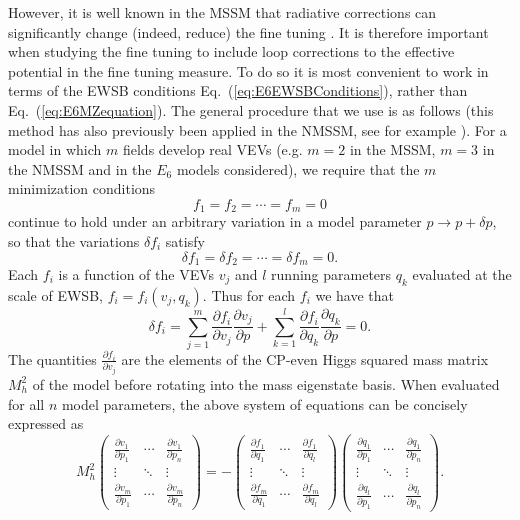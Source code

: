 \documentclass[preprint,amsmath,amssymb,aps,superscriptaddress,prd,
showpacs,floatfix,nofootinbib]{revtex4-1}
\begin{document}
However, it is well known in the MSSM that radiative corrections can
significantly change (indeed, reduce) the fine tuning \cite{Cassel:2010px}.
It is therefore important when studying the fine tuning to include loop
corrections to the effective potential in the fine tuning measure.  To do so
it is most convenient to work in terms of the EWSB conditions
Eq.~(\ref{eq:E6EWSBConditions}), rather than Eq.~(\ref{eq:E6MZequation}).
The general procedure that we use is as follows (this method has also
previously been applied in the NMSSM, see for example
\cite{Ellwanger:2011mu}).  For a model in which $m$ fields develop real
VEVs (e.g. $m=2$ in the MSSM, $m=3$ in the NMSSM and in the $E_6$
models considered), we require that the $m$ minimization conditions
\begin{equation} \label{eq:EWSBconditions}
f_1 = f_2 = \dotsb = f_m = 0
\end{equation}
continue to hold under an arbitrary variation in a model parameter
$p \rightarrow p + \delta p$, so that the variations $\delta f_i$ satisfy
\begin{equation} \label{eq:EWSBvariations}
\delta f_1 = \delta f_2 = \dotsb = \delta f_m = 0 .
\end{equation}
Each $f_i$ is a function of the VEVs $v_j$ and $l$ running parameters
$q_k$ evaluated at the scale of EWSB, $f_i = f_i(v_j , q_k)$.  Thus for
each $f_i$ we have that
\begin{equation} \label{eq:EWSBchainrule}
\delta f_i = \sum_{j=1}^m \frac{\partial f_i}{\partial v_j}
\frac{\partial v_j}{\partial p} + \sum_{k=1}^l \frac{\partial f_i}
{\partial q_k} \frac{\partial q_k}{\partial p} = 0 .
\end{equation}
The quantities $\frac{\partial f_i}{\partial v_j}$ are the elements of
the CP-even Higgs squared mass matrix $M_h^2$ of the model before
rotating into the mass eigenstate basis.  When evaluated for all $n$
model parameters, the above system of equations can be concisely
expressed as
\begin{equation} \label{eq:tuningsystem}
M_h^2 \begin{pmatrix}
\frac{\partial v_1}{\partial p_1} & \cdots &
\frac{\partial v_1}{\partial p_n} \\
\vdots & \ddots & \vdots \\
\frac{\partial v_m}{\partial p_1} & \cdots & \frac{\partial v_m}{\partial p_n}
\end{pmatrix} = -\begin{pmatrix}
\frac{\partial f_1}{\partial q_1} & \cdots & \frac{\partial f_1}
{\partial q_l} \\
\vdots & \ddots & \vdots \\
\frac{\partial f_m}{\partial q_1} & \cdots & \frac{\partial f_m}{\partial q_l}
\end{pmatrix}
\begin{pmatrix}
\frac{\partial q_1}{\partial p_1} & \cdots & \frac{\partial q_1}
{\partial p_n} \\
\vdots & \ddots & \vdots \\
\frac{\partial q_l}{\partial p_1} & \cdots & \frac{\partial q_l}{\partial p_n}
\end{pmatrix} .
\end{equation}
\end{document}
